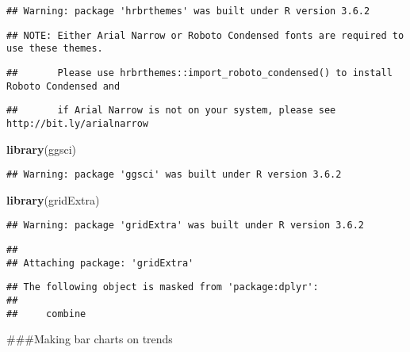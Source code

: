 \documentclass[]{article}
\newenvironment{Shaded}{\begin{snugshade}}{\end{snugshade}}
\newcommand{\CommentTok}[1]{\textcolor[rgb]{0.56,0.35,0.01}{\textit{#1}}}
\newcommand{\KeywordTok}[1]{\textcolor[rgb]{0.13,0.29,0.53}{\textbf{#1}}}
\newcommand{\NormalTok}[1]{#1}
\newcommand{\OperatorTok}[1]{\textcolor[rgb]{0.81,0.36,0.00}{\textbf{#1}}}
\newcommand{\StringTok}[1]{\textcolor[rgb]{0.31,0.60,0.02}{#1}}
\begin{document}
\begin{verbatim}
## Warning: package 'hrbrthemes' was built under R version 3.6.2
\end{verbatim}

\begin{verbatim}
## NOTE: Either Arial Narrow or Roboto Condensed fonts are required to use these themes.
\end{verbatim}

\begin{verbatim}
##       Please use hrbrthemes::import_roboto_condensed() to install Roboto Condensed and
\end{verbatim}

\begin{verbatim}
##       if Arial Narrow is not on your system, please see http://bit.ly/arialnarrow
\end{verbatim}

\begin{Shaded}
\begin{Highlighting}[]
\KeywordTok{library}\NormalTok{(ggsci)}
\end{Highlighting}
\end{Shaded}

\begin{verbatim}
## Warning: package 'ggsci' was built under R version 3.6.2
\end{verbatim}

\begin{Shaded}
\begin{Highlighting}[]
\KeywordTok{library}\NormalTok{(gridExtra)}
\end{Highlighting}
\end{Shaded}

\begin{verbatim}
## Warning: package 'gridExtra' was built under R version 3.6.2
\end{verbatim}

\begin{verbatim}
## 
## Attaching package: 'gridExtra'
\end{verbatim}

\begin{verbatim}
## The following object is masked from 'package:dplyr':
## 
##     combine
\end{verbatim}

\#\#\#Making bar charts on trends

\begin{Shaded}
\end{Shaded}
\end{document}
